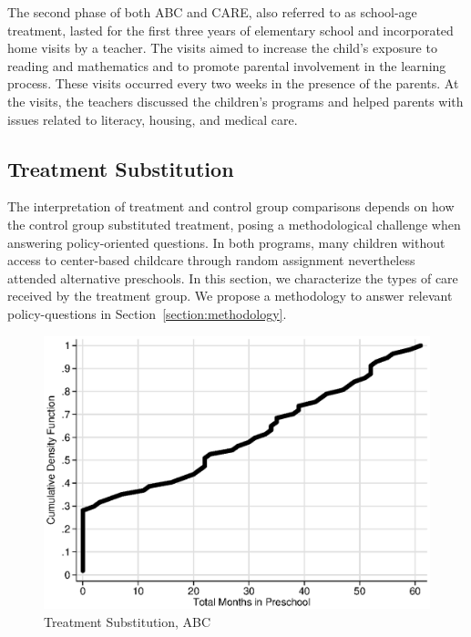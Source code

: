 \noindent The second phase of both ABC and CARE, also referred to as school-age treatment, lasted for the first three years of elementary school and incorporated home visits by a teacher. The visits aimed to increase the child's exposure to reading and mathematics and to promote parental involvement in the learning process. These visits occurred every two weeks in the presence of the parents. At the visits, the teachers discussed the children's programs and helped parents with issues related to literacy, housing, and medical care.\\

\subsection{Treatment Substitution}

\noindent The interpretation of treatment and control group comparisons depends on how the control group substituted treatment, posing a methodological challenge when answering policy-oriented questions. In both programs, many children without access to center-based childcare through random assignment nevertheless attended alternative preschools. In this section, we characterize the types of care received by the treatment group. We propose a methodology to answer relevant policy-questions in Section~\ref{section:methodology}.\\

\begin{figure}[H]
		\caption{Treatment Substitution, ABC} \label{fig:treatsubabc}
		\includegraphics[width=.9\columnwidth]{output/abc_controlcontamination_months.eps}
\end{figure}

